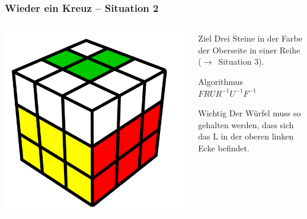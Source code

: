 \begin{frame}
	\frametitle{Wieder ein Kreuz -- Situation 2}
	
	\begin{columns}[c]
		\begin{column}[C]{.5\textwidth}
			\center
			\includegraphics[scale=0.3]{img/layer3L}
		\end{column}
		\begin{column}[C]{.5\textwidth}
			\begin{block}{Ziel}
				Drei Steine in der Farbe der Oberseite in einer Reihe ($\rightarrow$~Situation 3).
			\end{block}
			\begin{exampleblock}{Algorithmus}
				$FRUR^{-1}U^{-1}F^{-1}$
			\end{exampleblock}
			\begin{alertblock}{Wichtig}
				Der Würfel muss so gehalten werden, dass sich das \glqq L\grqq{} in der oberen linken Ecke befindet.
			\end{alertblock}
		\end{column}
	\end{columns}
	
\end{frame}

